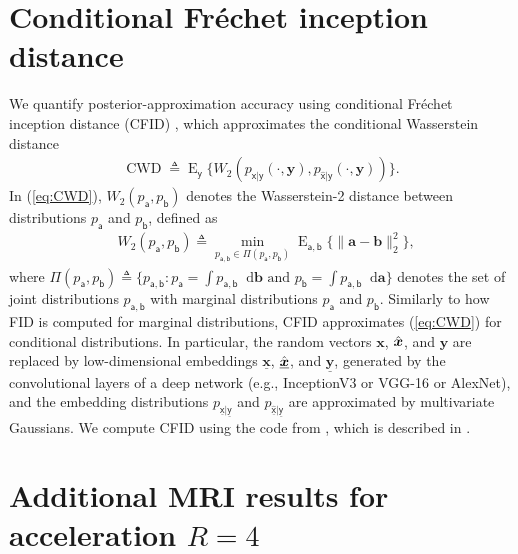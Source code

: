 \documentclass{article}
\theoremstyle{plain}
\theoremstyle{definition}
\theoremstyle{remark}
\renewcommand{\hat}{\widehat}
\newcommand{\defn}{\triangleq}
\newcommand{\uvec}[1]{\ensuremath{\underline{\boldsymbol{#1}}}}
\newcommand{\hvec}[1]{\ensuremath{\Hat{\boldsymbol{#1}}}}
\renewcommand{\vec}[1]{\ensuremath{\boldsymbol{#1}}}
\newcommand{\huvec}[1]{\ensuremath{\Hat{\underline{\boldsymbol{#1}}}}}
\newcommand*\deriv{\mathop{}\!\mathrm{d}}
\DeclareMathOperator{\E}{E}
\renewcommand{\eqref}[1]{(\ref{eq:#1})}
\DeclareMathOperator{\CWD}{CWD}
\newcommand{\pa}{p_{\mathsf{a}}}
\newcommand{\pb}{p_{\mathsf{b}}}
\newcommand{\pab}{p_{\mathsf{a,b}}}
\newcommand{\pxgy}{p_{\mathsf{x}|\mathsf{y}}}
\newcommand{\pxhgy}{p_{\hat{\mathsf{x}}|\mathsf{y}}}
\newcommand{\Eab}{\E_{\mathsf{a,b}}}
\newcommand{\Ey}{\E_{\mathsf{y}}}
\newcommand{\pxugyu}{p_{\underline{\mathsf{x}}|\underline{\mathsf{y}}}}
\newcommand{\pxuhgyu}{p_{\hat{\underline{\mathsf{x}}}|\underline{\mathsf{y}}}}
\begin{document}
\section{Conditional Fr\'echet inception distance} \label{app:cfid}
We quantify posterior-approximation accuracy using conditional Fr\'{e}chet inception distance (CFID) \cite{Soloveitchik:21}, which approximates the conditional Wasserstein distance
\begin{align}
\CWD \defn \Ey\{W_2(\pxgy(\cdot,\vec{y}),\pxhgy(\cdot,\vec{y}))\} 
\label{eq:CWD} .
\end{align}
In \eqref{CWD}, $W_2(\pa,\pb)$ denotes the Wasserstein-2 distance between distributions $\pa$ and $\pb$, defined as
\begin{align}
&W_2(\pa,\pb) 
\defn \min_{\pab\in \Pi(\pa,\pb)} \Eab\{\|\vec{a}-\vec{b}\|^2_2\} 
\label{eq:Pi} ,
\end{align}
where $\Pi(\pa,\pb) \defn \textstyle \big\{\pab : \pa=\int \pab\deriv \vec{b} \text{~and~} \pb=\int \pab \deriv \vec{a} \big\} $ denotes the set of joint distributions $\pab$ with marginal distributions $\pa$ and $\pb$.
Similarly to how FID \cite{Heusel:NIPS:17} is computed for marginal distributions, CFID approximates \eqref{CWD} for conditional distributions.
In particular, the random vectors $\vec{x}$, $\hvec{x}$, and $\vec{y}$ are replaced by low-dimensional embeddings $\uvec{x}$, $\huvec{x}$, and $\uvec{y}$, generated by the convolutional layers of a deep network (e.g., InceptionV3 or VGG-16 or AlexNet), and the embedding distributions $\pxugyu$ and $\pxuhgyu$ are approximated by multivariate Gaussians.
We compute CFID using the code from \cite{Bendel:github:23}, which is described in \cite{Bendel:NIPS:23}.

\section{Additional MRI results for acceleration \texorpdfstring{$R=4$}{R=4}} \label{app:mri}
\end{document}
